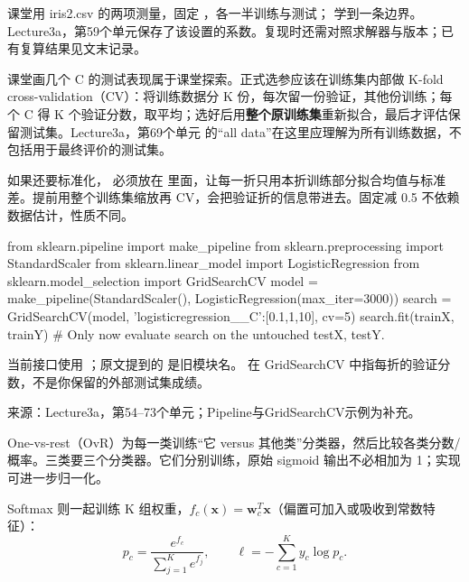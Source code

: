 课堂用 iris2.csv 的两项测量，固定 ，各一半训练与测试； 学到一条边界。Lecture3a，第59个单元保存了该设置的系数。复现时还需对照求解器与版本；已有复算结果见文末记录。


课堂画几个 C 的测试表现属于课堂探索。正式选参应该在训练集内部做 K-fold cross-validation（CV）：将训练数据分 K 份，每次留一份验证，其他份训练；每个 C 得 K 个验证分数，取平均；选好后用\textbf{整个原训练集}重新拟合，最后才评估保留测试集。Lecture3a，第69个单元 的“all data”在这里应理解为所有训练数据，不包括用于最终评价的测试集。


如果还要标准化， 必须放在  里面，让每一折只用本折训练部分拟合均值与标准差。提前用整个训练集缩放再 CV，会把验证折的信息带进去。固定减 0.5 不依赖数据估计，性质不同。



\begin{StudyCode}
from sklearn.pipeline import make_pipeline
from sklearn.preprocessing import StandardScaler
from sklearn.linear_model import LogisticRegression
from sklearn.model_selection import GridSearchCV
model = make_pipeline(StandardScaler(), LogisticRegression(max_iter=3000))
search = GridSearchCV(model, {'logisticregression__C':[0.1,1,10]}, cv=5)
search.fit(trainX, trainY)
# Only now evaluate search on the untouched testX, testY.
\end{StudyCode}


当前接口使用 ；原文提到的  是旧模块名。 在 GridSearchCV 中指每折的验证分数，不是你保留的外部测试集成绩。


来源：Lecture3a，第54–73个单元；Pipeline与GridSearchCV示例为补充。








One-vs-rest（OvR）为每一类训练“它 versus 其他类”分类器，然后比较各类分数/概率。三类要三个分类器。它们分别训练，原始 sigmoid 输出不必相加为 1；实现可进一步归一化。


Softmax 则一起训练 K 组权重，\(f_c(\mathbf x)=\mathbf w_c^T\mathbf x\)（偏置可加入或吸收到常数特征）：
\[
p_c=\frac{e^{f_c}}{\sum_{j=1}^K e^{f_j}},\qquad \ell=-\sum_{c=1}^K y_c\log p_c.\tag{3.7}
\]


